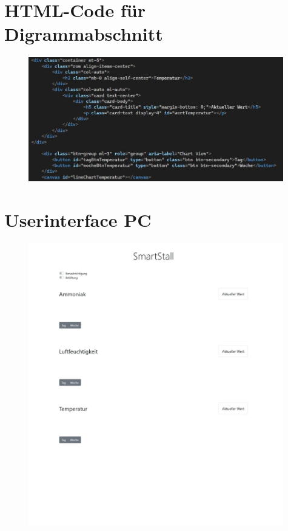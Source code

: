 \documentclass[conference]{IEEEtran}
\begin{document}
\clearpage
\begin{appendices}
\section{HTML-Code für Digrammabschnitt}
\label{sec:htmlCodeDiagrammAnhang}
\begin{figure}[h]
    \centering
    \includegraphics[width=0.99\textwidth]{fig/htmlcode.JPG}
\end{figure}

\clearpage
\section{Userinterface PC}
\label{sec:uiPCAnhang}
\begin{figure}[h]
    \centering
    \includegraphics[width=0.99\textwidth]{fig/uiPC.jpg}
\end{figure}


\end{appendices}
\end{document}
